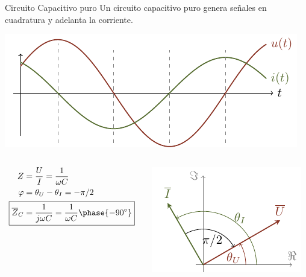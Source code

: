 \documentclass[aspectratio=169, usenames,svgnames,dvipsnames]{beamer}
\begin{document}
\begin{frame}[label={sec:org08f1ffb}]{Circuito Capacitivo puro}
Un circuito capacitivo puro genera \alert{señales en cuadratura} y \alert{adelanta la corriente}.

\begin{center}
\includegraphics[height=0.3\textheight]{../figs/capacitivoPuro.pdf}
\end{center}

\begin{columns}
\begin{column}{0.3\columnwidth}
\begin{align*}
  Z &= \dfrac{U}{I} = \dfrac{1}{\omega C}\\
  \varphi &= \theta_U - \theta_I = - \pi/2\\
  \Aboxed{\overline{Z}_C &= \dfrac{1}{j\omega C} = \dfrac{1}{\omega C}\phase{\ang{-90}}}
\end{align*}
\end{column}


\begin{column}{0.4\columnwidth}
\begin{center}
\includegraphics[height=0.4\textheight]{../figs/fasorCondensador_VI.pdf}
\end{center}
\end{column}



\end{columns}
\end{frame}
\end{document}
